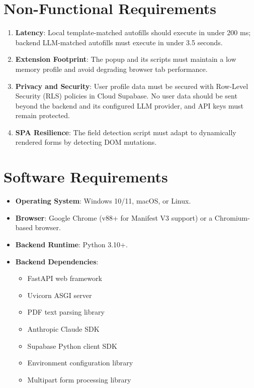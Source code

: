 \documentclass[12pt,a4paper]{report}
\begin{document}
\section{Non-Functional Requirements}
\begin{enumerate}
    \item \textbf{Latency}: Local template-matched autofills should execute in under 200 ms; backend LLM-matched autofills must execute in under 3.5 seconds.
    \item \textbf{Extension Footprint}: The popup and its scripts must maintain a low memory profile and avoid degrading browser tab performance.
    \item \textbf{Privacy and Security}: User profile data must be secured with Row-Level Security (RLS) policies in Cloud Supabase. No user data should be sent beyond the backend and its configured LLM provider, and API keys must remain protected.
    \item \textbf{SPA Resilience}: The field detection script must adapt to dynamically rendered forms by detecting DOM mutations.
\end{enumerate}

\section{Software Requirements}
\begin{itemize}
    \item \textbf{Operating System}: Windows 10/11, macOS, or Linux.
    \item \textbf{Browser}: Google Chrome (v88+ for Manifest V3 support) or a Chromium-based browser.
    \item \textbf{Backend Runtime}: Python 3.10+.
    \item \textbf{Backend Dependencies}:
    \begin{itemize}
        \item FastAPI web framework
        \item Uvicorn ASGI server
        \item PDF text parsing library
        \item Anthropic Claude SDK
        \item Supabase Python client SDK
        \item Environment configuration library
        \item Multipart form processing library
    \end{itemize}
\end{itemize}
\end{document}
